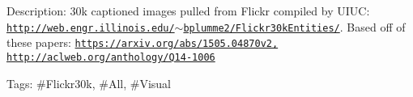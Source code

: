 Description\+: 30k captioned images pulled from Flickr compiled by U\+I\+UC\+: \href{http://web.engr.illinois.edu/~bplumme2/Flickr30kEntities/}{\tt http\+://web.\+engr.\+illinois.\+edu/$\sim$bplumme2/\+Flickr30k\+Entities/}. Based off of these papers\+: \href{https://arxiv.org/abs/1505.04870v2,}{\tt https\+://arxiv.\+org/abs/1505.\+04870v2,} \href{http://aclweb.org/anthology/Q14-1006}{\tt http\+://aclweb.\+org/anthology/\+Q14-\/1006}

Tags\+: \#\+Flickr30k, \#\+All, \#\+Visual 